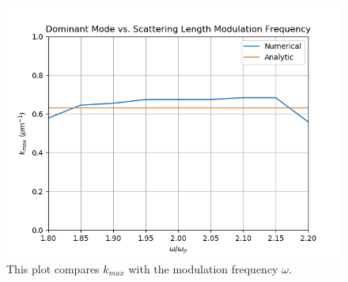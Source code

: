\documentclass[12]{article}
\begin{document}
\begin{figure}[b]
\centering
\includegraphics[scale=0.9]{kmaxExpUnits}
\caption{This plot compares $k_{max}$ with the modulation frequency $\omega$.}
\label{fig:kmaxExp}
\end{figure}




\end{document}
